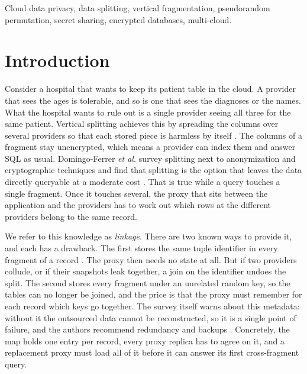 \documentclass[conference]{IEEEtran}
\begin{document}
\begin{IEEEkeywords}
Cloud data privacy, data splitting, vertical fragmentation, pseudorandom permutation, secret sharing, encrypted databases, multi-cloud.
\end{IEEEkeywords}

\section{Introduction}
Consider a hospital that wants to keep its patient table in the cloud. A provider that sees the ages is tolerable, and so is one that sees the diagnoses or the names. What the hospital wants to rule out is a single provider seeing all three for the same patient. Vertical splitting achieves this by spreading the columns over several providers so that each stored piece is harmless by itself \cite{aggarwal2005two,ciriani2010combining,ganapathy2012distributing}. The columns of a fragment stay unencrypted, which means a provider can index them and answer SQL as usual. Domingo-Ferrer \emph{et al.} survey splitting next to anonymization and cryptographic techniques and find that splitting is the option that leaves the data directly queryable at a moderate cost \cite{domingo2019survey}. That is true while a query touches a single fragment. Once it touches several, the proxy that sits between the application and the providers has to work out which rows at the different providers belong to the same record.

We refer to this knowledge as \emph{linkage}. There are two known ways to provide it, and each has a drawback. The first stores the same tuple identifier in every fragment of a record \cite{aggarwal2005two}. The proxy then needs no state at all. But if two providers collude, or if their snapshots leak together, a join on the identifier undoes the split. The second stores every fragment under an unrelated random key, so the tables can no longer be joined, and the price is that the proxy must remember for each record which keys go together. The survey itself warns about this metadata: without it the outsourced data cannot be reconstructed, so it is a single point of failure, and the authors recommend redundancy and backups \cite[Sec.~3.1.1]{domingo2019survey}. Concretely, the map holds one entry per record, every proxy replica has to agree on it, and a replacement proxy must load all of it before it can answer its first cross-fragment query.
\end{document}
